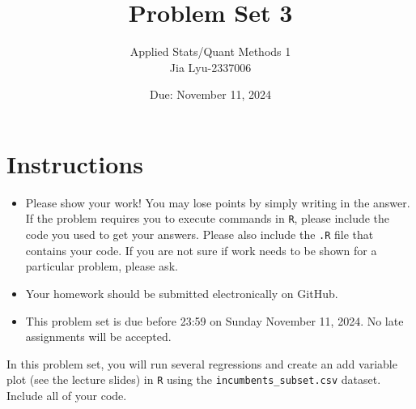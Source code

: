 \documentclass[12pt,letterpaper]{article}
\title{Problem Set 3}
\date{Due: November 11, 2024}
\author{Applied Stats/Quant Methods 1
	\\ Jia Lyu-2337006}
\begin{document}
	\maketitle
	\section*{Instructions}
	\begin{itemize}
		\item Please show your work! You may lose points by simply writing in the answer. If the problem requires you to execute commands in \texttt{R}, please include the code you used to get your answers. Please also include the \texttt{.R} file that contains your code. If you are not sure if work needs to be shown for a particular problem, please ask.
	\item Your homework should be submitted electronically on GitHub.
	\item This problem set is due before 23:59 on Sunday November 11, 2024. No late assignments will be accepted.

	\end{itemize}

		\vspace{.25cm}
	
\noindent In this problem set, you will run several regressions and create an add variable plot (see the lecture slides) in \texttt{R} using the \texttt{incumbents\_subset.csv} dataset. Include all of your code.

	\vspace{.5cm}
\end{document}
